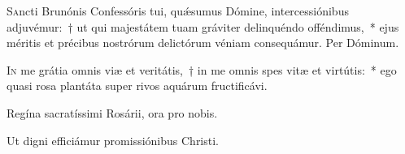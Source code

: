 \documentclass[vesperale_romanum.tex]{subfiles}
\begin{document}
\myrule


\duplex


\oratio

\lettrine{S}{a}ncti Brunónis Confessóris tui, quǽsumus Dómine, intercessiónibus adjuvémur:~† ut qui majestátem tuam gráviter delinquéndo offéndimus,~* ejus méritis et précibus nostrórum delictórum véniam consequámur. Per Dóminum.

\vespsequentiscomm

\myrule

\newpage







%

\label{112_6_alt_15_sept}
{}
%

%
%


\lettrine{I}{n} me grátia omnis viæ et veritátis,~† in me omnis spes vitæ et virtútis:~* ego quasi rosa plantáta super rivos aquárum fructificávi.

\hymnus


\vv Regína sacratíssimi Rosárii, ora pro nobis.

\rr Ut digni efficiámur promissiónibus Christi.
\end{document}
